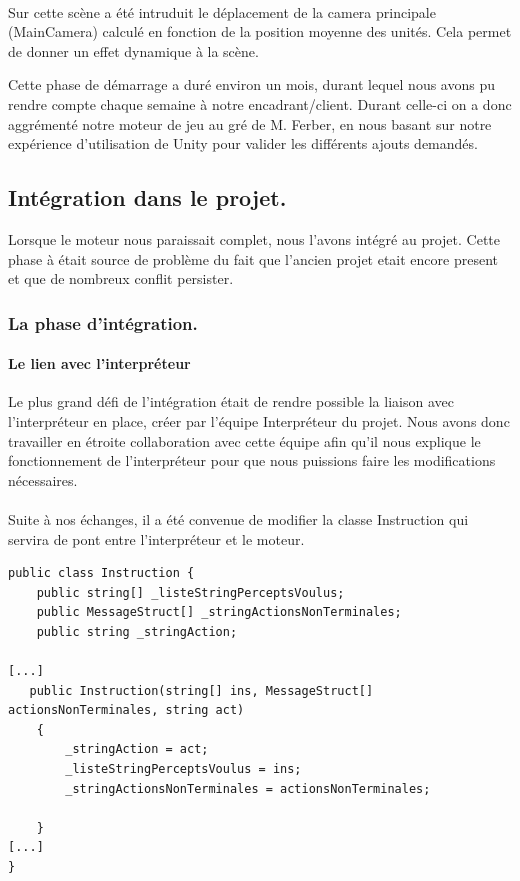\documentclass{report}
\begin{document}
\paragraph{}Sur cette scène a été intruduit le déplacement de la camera principale (MainCamera) calculé en fonction de la position moyenne des unités. Cela permet de donner un effet dynamique à la scène.

Cette phase de démarrage a duré environ un mois, durant lequel nous avons pu rendre compte chaque semaine à notre encadrant/client. Durant celle-ci on a donc aggrémenté notre moteur de jeu au gré de M. Ferber, en nous basant sur notre expérience d'utilisation de Unity pour valider les différents ajouts demandés.

\subsection{Intégration dans le projet.}
Lorsque le moteur nous paraissait complet, nous l'avons intégré au projet. Cette phase à était source de problème du fait que l'ancien projet etait encore present et que de nombreux conflit persister.

\subsubsection{La phase d'intégration.} 
\paragraph{Le lien avec l’interpréteur} Le plus grand défi de l’intégration était de rendre possible la liaison avec l’interpréteur en place, créer par l'équipe Interpréteur du projet. Nous avons donc travailler en étroite collaboration avec cette équipe afin qu'il nous explique le fonctionnement de l’interpréteur pour que nous puissions faire les modifications nécessaires.
\paragraph{}Suite à nos échanges, il a été convenue de modifier la classe Instruction qui servira de pont entre l’interpréteur et le moteur.

\begin{lstlisting}[language={[Sharp]C},label={lst:InstructionScript}, caption=  Extrait du code du script Instruction.cs]
public class Instruction {
    public string[] _listeStringPerceptsVoulus;
    public MessageStruct[] _stringActionsNonTerminales;
    public string _stringAction;
    
[...]
   public Instruction(string[] ins, MessageStruct[] actionsNonTerminales, string act)
    {
        _stringAction = act;
        _listeStringPerceptsVoulus = ins;
        _stringActionsNonTerminales = actionsNonTerminales;

    }
[...]
}
\end{lstlisting}
\end{document}
